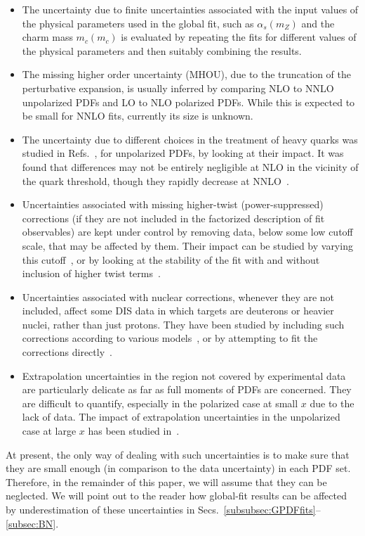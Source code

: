 \begin{itemize}

\item The uncertainty due to finite uncertainties 
associated with the input values of the physical parameters used in the global 
fit, such as $\alpha_s(m_Z)$ and the charm mass $m_c(m_c)$ is 
evaluated by repeating the fits for different values of the physical 
parameters and then suitably combining the results.

\item The missing higher order uncertainty (MHOU), due to the truncation
of the perturbative expansion, is usually inferred by comparing NLO to NNLO 
unpolarized PDFs and LO to NLO polarized PDFs.
%
While this is expected to be small for NNLO fits, currently its size is unknown.

\item The uncertainty due to different choices in the treatment of heavy quarks
was studied in Refs.~\cite{Binoth:2010nha,Thorne:2012az}, for unpolarized PDFs, 
by looking at their impact.
%
It was found that differences may not be entirely negligible at NLO in 
the vicinity of the quark threshold, though they rapidly decrease at 
NNLO~\cite{Binoth:2010nha}.

\item Uncertainties associated with missing higher-twist (power-suppressed) 
corrections (if they are not included in the factorized description of 
fit observables) are kept under control by removing data, below some low cutoff 
scale, that may be affected by them. 
%
Their impact can be studied by varying this 
cutoff~\cite{Martin:2003sk,Accardi:2009br}, or
by looking at the stability of the fit with and without inclusion of higher 
twist terms~\cite{Sato:2016tuz,Accardi:2016qay,Alekhin:2017kpj}.

\item Uncertainties associated with nuclear corrections, whenever they are
not included, affect some DIS data in which targets are deuterons or heavier 
nuclei, rather than just protons.
%
They have been studied by including such corrections according to various 
models~\cite{Martin:2009iq,Ball:2009mk,Sato:2016tuz,Accardi:2016qay}, 
or by attempting to fit the corrections 
directly~\cite{Martin:2009iq,Martin:2012da}.

\item Extrapolation uncertainties in the region not covered 
by experimental data are particularly delicate as far as full moments of PDFs
are concerned.
%
They are difficult to quantify, especially in the polarized case at small $x$
due to the lack of data.
%
The impact of extrapolation uncertainties in the unpolarized case at large $x$
has been studied in~\cite{Accardi:2011fa,Accardi:2016ndt}.

\end{itemize}
%
At present, the only way of dealing with such uncertainties is to make sure 
that they are small enough (in comparison to the data uncertainty)
in each PDF set.
%
Therefore, in the remainder of this paper, 
we will assume that they can be neglected.
%
We will point out to the reader how global-fit results can be affected 
by underestimation of these uncertainties in 
Secs.~\ref{subsubsec:GPDFfits}--\ref{subsec:BN}.

